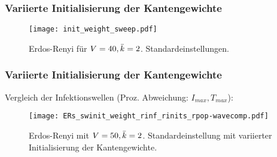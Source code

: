 \begin{frame}[t]
    \frametitle{Variierte Initialisierung der Kantengewichte}
    \begin{figure}[htpb]
        \centering
        \texttt{[image: init\_weight\_sweep.pdf]}
        \caption{Erdos-Renyi für $V = 40, \bar{k}=2$. Standardeinstellungen.}%
        \label{fig:init_weight_sweep}
    \end{figure}
\end{frame}
\begin{frame}[t]
\frametitle{Variierte Initialisierung der Kantengewichte}
Vergleich der Infektionswellen (Proz. Abweichung: $I_{max}, T_{max}$):
    \begin{figure}[htpb]
        \centering
        \texttt{[image: ERs\_swinit\_weight\_rinf\_rinits\_rpop-wavecomp.pdf]}
        \caption{Erdos-Renyi mit $V = 50, \bar{k}=2$. Standardeinstellung mit variierter
        Initialisierung der Kantengewichte.}%
        \label{fig:ERs_swinit_weight_rinf_rinits_rpop-wavecomp}
    \end{figure}
    
\end{frame}
